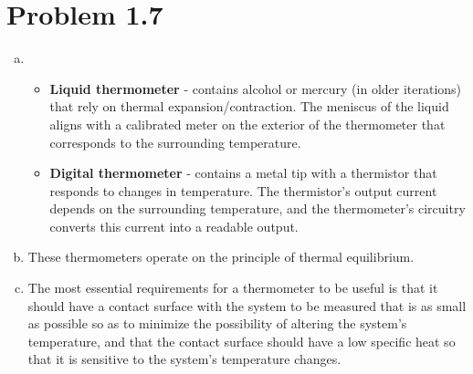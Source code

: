 \documentclass[12pt,a4paper,twocolumn]{article}
\begin{document}
\setcounter{page}{1}

\section*{Problem 1.7}
\begin{enumerate}[(a)]

\item
	\begin{itemize}

		\item \textbf{Liquid thermometer} - contains alcohol or mercury (in older iterations) that rely on thermal expansion/contraction. The meniscus of the liquid aligns with a calibrated meter on the exterior of the thermometer that corresponds to the surrounding temperature.

		\item \textbf{Digital thermometer} - contains a metal tip with a thermistor that responds to changes in temperature. The thermistor's output current depends on the surrounding temperature, and the thermometer's circuitry converts this current into a readable output.

	\end{itemize}

\item These thermometers operate on the principle of thermal equilibrium.

\item The most essential requirements for a thermometer to be useful is that it should have a contact surface with the system to be measured that is as small as possible so as to minimize the possibility of altering the system's temperature, and that the contact surface should have a low specific heat so that it is sensitive to the system's temperature changes.

\end{enumerate}
\end{document}
